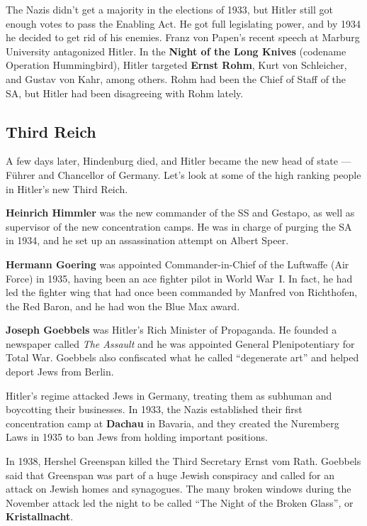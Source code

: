 The Nazis didn't get a majority in the elections of 1933,
but Hitler still got enough votes to pass the Enabling Act.
He got full legislating power, and by 1934 he decided to get rid of his enemies.
Franz von Papen's recent speech at Marburg University antagonized Hitler.
In the \textbf{Night of the Long Knives} (codename Operation Hummingbird),
Hitler targeted \textbf{Ernst Rohm}, Kurt von Schleicher, and Gustav von Kahr, among others.
Rohm had been the Chief of Staff of the SA, but Hitler had been disagreeing with Rohm lately.

\subsection*{Third Reich}

A few days later, Hindenburg died,
and Hitler became the new head of state --- F\"uhrer and Chancellor of Germany.
Let's look at some of the high ranking people in Hitler's new Third Reich.

\textbf{Heinrich Himmler} was the new commander of the SS and Gestapo,
as well as supervisor of the new concentration camps.
He was in charge of purging the SA in 1934,
and he set up an assassination attempt on Albert Speer.

\textbf{Hermann Goering} was appointed Commander-in-Chief of the Luftwaffe (Air Force) in 1935,
having been an ace fighter pilot in World War~I.
In fact, he had led the fighter wing that had once been commanded by Manfred von Richthofen,
the Red Baron, and he had won the Blue Max award.

\textbf{Joseph Goebbels} was Hitler's Rich Minister of Propaganda.
He founded a newspaper called \textit{The Assault}
and he was appointed General Plenipotentiary for Total War.
Goebbels also confiscated what he called ``degenerate art'' and helped deport Jews from Berlin.

Hitler's regime attacked Jews in Germany, treating them as subhuman and boycotting their businesses.
In 1933, the Nazis established their first concentration camp at \textbf{Dachau} in Bavaria,
and they created the Nuremberg Laws in 1935 to ban Jews from holding important positions.

In 1938, Hershel Greenspan killed the Third Secretary Ernst vom Rath.
Goebbels said that Greenspan was part of a huge Jewish conspiracy and
called for an attack on Jewish homes and synagogues.
The many broken windows during the November attack
led the night to be called ``The Night of the Broken Glass'',
or \textbf{Kristallnacht}.

